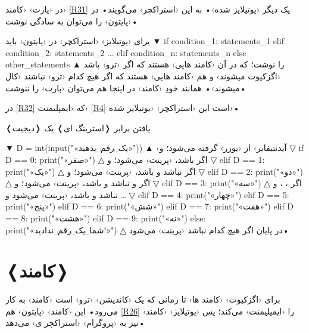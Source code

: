 \documentclass[openany, twocolumn]{book}
\begin{document}
در ‹پارت›  ‹کامند›  \ref{R31} یک  دیگر ‹یوتیلایز شده›• به این ‹استراکچر›  می‌گویند• در ‹پایتون›  را می‌توان به سادگی  نوشت•

\begin{Usage}
برای ‹یوتیلایز› ‹استراکچر›  در ‹پایتون› باید 
▼
if condition_1:
	statements_1
elif condition_2:
	statements_2
...
elif condition_n:
	statements_n
else
	other_statements
▲
 را نوشت؛ که در آن  ‹کامند هایی› هستند که اگر  ‹ترو› باشد ‹اگزکیوت میشوند› و  هم ‹کامند هایی› هستند که اگر هیچ کدام ‹ترو› نباشند ‹کال میشوند›• همانند خودِ ‹کامند›  در اینجا هم می‌توان ‹پارت›  را ننوشت•
\end{Usage}

در \ref{R32} که ‹ایمپلیمنت› \ref{R4} است این ‹استراکچر› ‹یوتیلایز شده›•

\begin{Program}
\caption{یافتن برابر ❬استرینگ ای❭ یک ❬دیجیت❭\label{R32}}

▼
D = int(input("«یک␣رقم␣بدهید»"))
▲
 ‹آیدنتیفایر›  از ‹یوزر› گرفته می‌شود؛ و 
▽
if D == 0:
	print("«صفر»")
△
 اگر  باشد،  ‹پرینت› می‌شود؛ و 
▽
elif D == 1:
	print("«یک»")
△
 اگر  نباشد و  باشد،  ‹پرینت› می‌شود؛ و 
▽
elif D == 2:
	print("«دو»")
△
 اگر  و  نباشد و  باشد،  ‹پرینت› می‌شود؛ و 
▽
elif D == 3:
	print("«سه»")
△
 اگر ، ، و  نباشد و  باشد،  ‹پرینت› می‌شود و \ldots{} 
▽
elif D == 4:
	print("«چهار»")
elif D == 5:
	print("«پنج»")
elif D == 6:
	print("«شش»")
elif D == 7:
	print("«هفت»")
elif D == 8:
	print("«هشت»")
elif D == 9:
	print("«نه»")
else:
	print("«شما␣یک␣رقم␣ندادید!»")
△
 در پایان اگر هیچ کدام نباشد  ‹پرینت› می‌شود•
\end{Program}

\section{❬کامند❭ \label{R33}}
برای ‹اگزکیوت› ‹کامند ها› تا زمانی که یک ‹کاندیشن› ‹ترو› است ‹کامند›  به کار می‌رود• این ‹کامند› ‹پایتون› هم \ref{R26} را ‹ایمپلیمنت› می‌کند؛ پس ‹یوتیلایز› ‹کامند›  نیز به ‹پروگرام› ‹استراکچر ی› می‌دهد•
\end{document}
